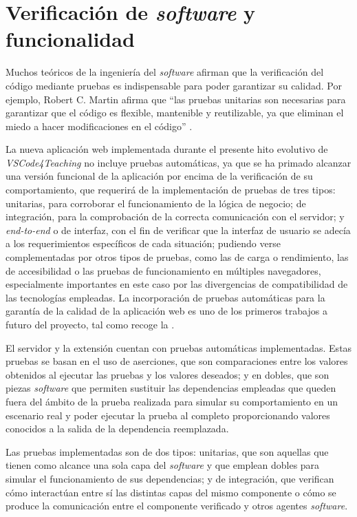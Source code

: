 \section{Verificación de \textit{software} y funcionalidad}
\label{sec:verificacion}
Muchos teóricos de la ingeniería del \textit{software} afirman que la verificación del código mediante pruebas es indispensable para poder garantizar su calidad. Por ejemplo, Robert C. Martin afirma que ``las pruebas unitarias son necesarias para garantizar que el código es flexible, mantenible y reutilizable, ya que eliminan el miedo a hacer modificaciones en el código'' \cite{CleanCode}.

La nueva aplicación web implementada durante el presente hito evolutivo de \textit{VSCode4Teaching} no incluye pruebas automáticas, ya que se ha primado alcanzar una versión funcional de la aplicación por encima de la verificación de su comportamiento, que requerirá de la implementación de pruebas de tres tipos: unitarias, para corroborar el funcionamiento de la lógica de negocio; de integración, para la comprobación de la correcta comunicación con el servidor; y \textit{end-to-end} o de interfaz, con el fin de verificar que la interfaz de usuario se adecía a los requerimientos específicos de cada situación; pudiendo verse complementadas por otros tipos de pruebas, como las de carga o rendimiento, las de accesibilidad o las pruebas de funcionamiento en múltiples navegadores, especialmente importantes en este caso por las divergencias de compatibilidad de las tecnologías empleadas. La incorporación de pruebas automáticas para la garantía de la calidad de la aplicación web es uno de los primeros trabajos a futuro del proyecto, tal como recoge la .

El servidor y la extensión cuentan con pruebas automáticas implementadas. Estas pruebas se basan en el uso de aserciones, que son comparaciones entre los valores obtenidos al ejecutar las pruebas y los valores deseados; y en dobles, que son piezas \textit{software} que permiten sustituir las dependencias empleadas que queden fuera del ámbito de la prueba realizada para simular su comportamiento en un escenario real y poder ejecutar la prueba al completo proporcionando valores conocidos a la salida de la dependencia reemplazada.

Las pruebas implementadas son de dos tipos: unitarias, que son aquellas que tienen como alcance una sola capa del \textit{software} y que emplean dobles para simular el funcionamiento de sus dependencias; y de integración, que verifican cómo interactúan entre sí las distintas capas del mismo componente o cómo se produce la comunicación entre el componente verificado y otros agentes \textit{software}.

